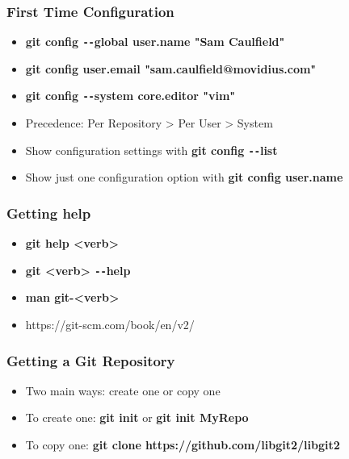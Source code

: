 \documentclass{beamer}
\begin{document}
\begin{frame}
	\frametitle{First Time Configuration}
	\begin{itemize}
		\item{\textbf{git config \texttt{-{}-}global user.name "Sam Caulfield"}}
		\item{\textbf{git config user.email "sam.caulfield@movidius.com"}}
		\item{\textbf{git config \texttt{-{}-}system core.editor "vim"}}
		\item{Precedence: Per Repository \textgreater{} Per User \textgreater{} System}
		\item{Show configuration settings with \textbf{git config \texttt{-{}-}list}}
		\item{Show just one configuration option with \textbf{git config user.name}}
	\end{itemize}
\end{frame}

\begin{frame}
	\frametitle{Getting help}
	\begin{itemize}
		\item{\textbf{git help \textless{}verb\textgreater{}}}
		\item{\textbf{git \textless{}verb\textgreater{} \texttt{-{}-}help}}
		\item{\textbf{man git-\textless{}verb\textgreater{}}}
		\item{https://git-scm.com/book/en/v2/}
	\end{itemize}
\end{frame}


\begin{frame}
	\frametitle{Getting a Git Repository}
	\begin{itemize}
		\item{Two main ways: create one or copy one}
		\item{To create one: \textbf{git init} or \textbf{git init MyRepo}}
		\item{To copy one: \textbf{git clone https://github.com/libgit2/libgit2}}
	\end{itemize}

\end{frame}
\end{document}

